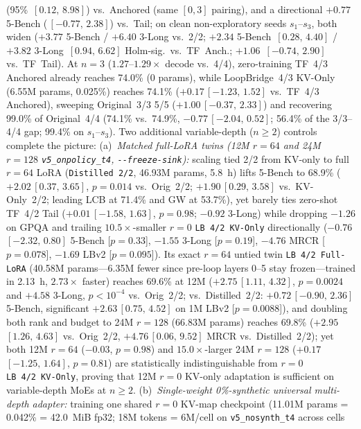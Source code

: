 \documentclass[11pt]{article}
\newcommand{\ci}[2]{\,{\scriptsize\ensuremath{[#1,\,#2]}}}
\begin{document}
\begin{enumerate}
(95\% \ci{0.12}{8.98}) vs.\ Anchored (same $[0,3]$ pairing), and a directional $+0.77$ 5-Bench (\ci{-0.77}{2.38}) vs.\
Tail; on clean non-exploratory seeds $s_1$--$s_3$, both widen ($+3.77$ 5-Bench / $+6.40$ 3-Long vs.\ 2/2; $+2.34$
5-Bench \ci{0.28}{4.40} / $+3.82$ 3-Long \ci{0.94}{6.62} Holm-sig.\ vs.\ TF~Anch.; $+1.06$ \ci{-0.74}{2.90} vs.\
TF~Tail). At $n{=}3$ ($1.27$--$1.29\times$ decode vs.\ 4/4), zero-training TF~4/3 Anchored already reaches 74.0\%
(0 params), while LoopBridge~4/3 KV-Only (6.55M params, 0.025\%) reaches 74.1\% ($+0.17$\ci{-1.23}{1.52} vs.\ TF~4/3
Anchored), sweeping Original~3/3 5/5 ($+1.00$\ci{-0.37}{2.33}) and recovering 99.0\% of Original~4/4 (74.1\% vs.\
74.9\%, $-0.77$\ci{-2.04}{0.52}; 56.4\% of the 3/3--4/4 gap; 99.4\% on $s_1$--$s_3$).
Two additional variable-depth ($n{\ge}2$) controls complete the picture:
(a)~\emph{Matched full-LoRA twins (12M $r{=}64$ and 24M $r{=}128$ \texttt{v5\_onpolicy\_t4}, \texttt{-\/-freeze-sink}):} scaling tied 2/2
from KV-only to full $r{=}64$ LoRA (\texttt{Distilled~2/2}, 46.93M params, 5.8~h) lifts 5-Bench to 68.9\%
($+2.02$\ci{0.37}{3.65}, $p{=}0.014$ vs.\ Orig~2/2; $+1.90$\ci{0.29}{3.58} vs.\ KV-Only~2/2; leading LCB at 71.4\% and GW
at 53.7\%), yet barely ties zero-shot TF~4/2 Tail ($+0.01$\ci{-1.58}{1.63}, $p{=}0.98$; $-0.92$ 3-Long) while dropping
$-1.26$ on GPQA and trailing $10.5\times$-smaller $r{=}0$ \texttt{LB~4/2~KV-Only} directionally ($-0.76$\ci{-2.32}{0.80}
5-Bench [$p{=}0.33$], $-1.55$ 3-Long [$p{=}0.19$], $-4.76$ MRCR [$p{=}0.078$], $-1.69$ LBv2 [$p{=}0.095$]). Its exact
$r{=}64$ untied twin \texttt{LB~4/2~Full-LoRA} (40.58M params---6.35M fewer since pre-loop layers 0--5 stay
frozen---trained in 2.13~h, $2.73\times$ faster) reaches 69.6\% at 12M ($+2.75$\ci{1.11}{4.32}, $p{=}0.0024$ and $+4.58$
3-Long, $p{<}10^{-4}$ vs.\ Orig~2/2; vs.\ Distilled~2/2: $+0.72$\ci{-0.90}{2.36} 5-Bench, significant
$+2.63$\ci{0.75}{4.52} on 1M LBv2 [$p{=}0.0088$]), and doubling both rank and budget to 24M $r{=}128$ (66.83M params)
reaches 69.8\% ($+2.95$\ci{1.26}{4.63} vs.\ Orig~2/2, $+4.76$\ci{0.06}{9.52} MRCR vs.\ Distilled~2/2); yet both 12M
$r{=}64$ ($-0.03$, $p{=}0.98$) and $15.0\times$-larger 24M $r{=}128$ ($+0.17$\ci{-1.25}{1.64}, $p{=}0.81$) are
statistically indistinguishable from $r{=}0$ \texttt{LB~4/2~KV-Only}, proving that 12M $r{=}0$ KV-only adaptation is
sufficient on variable-depth MoEs at $n{\ge}2$.
(b)~\emph{Single-weight 0\%-synthetic universal multi-depth adapter:} training one shared $r{=}0$ KV-map checkpoint
(11.01M params = 0.042\% = 42.0~MiB fp32; 18M tokens = 6M/cell on \texttt{v5\_nosynth\_t4} across cells

\end{enumerate}
\end{document}
